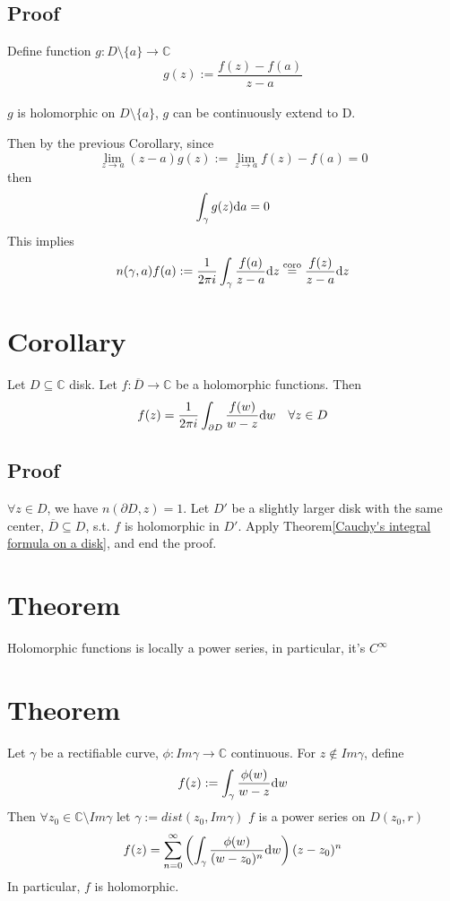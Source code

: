\documentclass{book}
\begin{document}
\subsection*{Proof}
Define function $g:D\setminus\{a\}\to \mathbb C$$$g(z):=\frac{f(z)-f(a)}{z-a}$$\\
$g$ is holomorphic on $D\setminus\{a\}$, $g$ can be continuously extend to D.

Then by the previous Corollary, since $$\lim\limits_{z\to a}(z-a)g(z):=\lim\limits_{z\to a}f(z)-f(a)=0$$then$$\int_\gamma g(z)\text da=0$$
This implies$$n(\gamma,a)f(a):=\frac{1}{2\pi i}\int_\gamma\frac{f(a)}{z-a}\text dz\stackrel{\text{coro}}{=}\frac{f(z)}{z-a}\text dz$$
\section{Corollary}
\label{Corollary 4.4}
Let $D\subseteq \mathbb C$ disk. Let $f:\overline D\to \mathbb C$ be a holomorphic functions. Then $$f(z)=\frac{1}{2\pi i}\int_{\partial D}\frac{f(w)}{w-z}\text dw\quad\forall z\in D$$
\subsection*{Proof}
$\forall z\in D$, we have $n(\partial D,z)=1$. Let $D'$ be a slightly larger disk with the same center, $\overline D\subseteq D$, s.t. $f$ is holomorphic in $D'$. Apply Theorem\ref{Cauchy's integral formula on a disk}, and end the proof.
\section{Theorem}Holomorphic functions is locally a power series, in particular, it's $C^\infty$
\section{Theorem}
\label{Theorem 4.5}
Let $\gamma$ be a rectifiable curve, $\phi:Im\gamma\to \mathbb C$ continuous. For $z\notin Im \gamma$, define $$f(z):=\int_\gamma\frac{\phi(w)}{w-z}\text dw$$
Then $\forall z_0\in \mathbb C\setminus Im\gamma$ let $\gamma:=dist(z_0,Im\gamma)$ $f$ is a power series on $D(z_0,r)$
$$f(z)=\sum\limits_{n=0}^\infty\left(\int_\gamma\frac{\phi(w)}{(w-z_0)^{n}}\text dw\right)(z-z_0)^n$$
In particular, $f$ is holomorphic.
\end{document}
